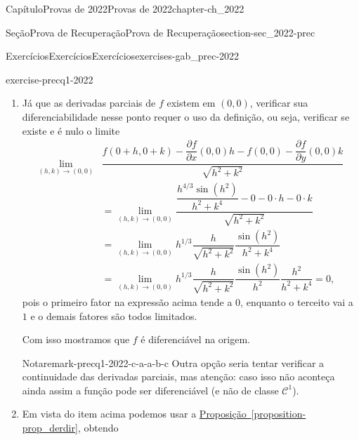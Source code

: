 \documentclass[oneside,10pt,]{book}
\newcommand{\xreffont}{\relax}
\numberwithin{equation}{section}
\begin{document}
\begin{chapterptx}{Capítulo}{Provas de 2022}{}{Provas de 2022}{}{}{chapter-ch_2022}
\begin{sectionptx}{Seção}{Prova de Recuperação}{}{Prova de Recuperação}{}{}{section-sec_2022-prec}
\begin{exercises-subsection-numberless}{Exercícios}{Exercícios}{}{Exercícios}{}{}{exercises-gab_prec-2022}
\begin{divisionexercise}{1}{}{}{exercise-precq1-2022}
\begin{enumerate}[label=\alph*.]
\begin{itemize}[label=\textbullet]
\begin{align*}
\dfrac{\partial f}{\partial y}(x,y)
&=-\dfrac{4x^{4/3}\sin(x^2)y^3}{(x^2+y^4)^2}
\end{align*}
%
\item{}\((x,y)=(0,0)\): não podemos aplicar a regra do quociente, utilizada no caso anterior. É preciso seguir pela \hyperref[definition-def_derpar]{Definição~{\xreffont\ref{definition-def_derpar}}}:%
\begin{align*}
\dfrac{\partial f}{\partial x}(0,0) &
=\lim\limits_{h\to
0}\dfrac{f(0+h,0)-f(0,0)}{h}=\lim\limits_{h\to
0}\dfrac{\dfrac{h^{4/3}\sin(h^2)}{h^2+0^4}-0}{h}\\
&=\lim\limits_{h\to
0}\dfrac{\sin(h^2)}{h^{5/3}}=\lim\limits_{h\to
0}h^{1/3}\dfrac{\sin(h^2)}{h^2}=0.\\
\dfrac{\partial f}{\partial y}(0,0) &
=\lim\limits_{k\to 0}\dfrac{f(0,0+k)-f(0,0)}{k}=\lim\limits_{h\to
0}\dfrac{\dfrac{0^{4/3}\sin(0^2)}{0^2+k^4}-0}{k}\\
&=\lim\limits_{k\to
0}\dfrac{0}{k}=0.
\end{align*}
%
\end{itemize}
%
\item{}Já que as derivadas parciais de \(f\) existem em \((0,0)\), verificar sua diferenciabilidade nesse ponto requer o uso da definição, ou seja, verificar se existe e é nulo o limite%
\begin{align*}
\lim\limits_{(h,k)\to(0,0)}&\dfrac{f(0+h,0+k)-\dfrac{\partial
f}{\partial x}(0,0)h-f(0,0)-\dfrac{\partial
f}{\partial
y}(0,0)k}{\sqrt{h^2+k^2}}\\
&=\lim\limits_{(h,k)\to(0,0)}\dfrac{\dfrac{h^{4/3}\sin(h^2)}{h^2+k^4}
-0-0\cdot h-0\cdot k}{\sqrt{h^2+k^2}}\\
&=\lim\limits_{(h,k)\to(0,0)}h^{1/3}\dfrac{h}{\sqrt{h^2+k^2}}
\dfrac{\sin(h^2)}{h^2+k^4}\\
&=\lim\limits_{(h,k)\to(0,0)}h^{1/3}\dfrac{h}{\sqrt{h^2+k^2}}
\dfrac{\sin(h^2)}{h^2}\dfrac{h^2}{h^2+k^4}=0,
\end{align*}
pois o primeiro fator na expressão acima tende a \(0\), enquanto o terceito vai a \(1\) e o demais fatores são todos limitados.%
\par
Com isso mostramos que \(f\) é diferenciável na origem.%
\begin{remark}{Nota}{}{remark-precq1-2022-c-a-a-b-c}%
Outra opção seria tentar verificar a continuidade das derivadas parciais, mas atenção: caso isso não aconteça ainda assim a função pode ser diferenciável (e não de classe \(\mathscr{C}^1\)).\end{remark}
\item{}Em vista do item acima podemos usar a \hyperref[proposition-prop_derdir]{Proposição~{\xreffont\ref{proposition-prop_derdir}}}, obtendo%

\end{enumerate}
\end{divisionexercise}
\end{exercises-subsection-numberless}
\end{sectionptx}
\end{chapterptx}
\end{document}
